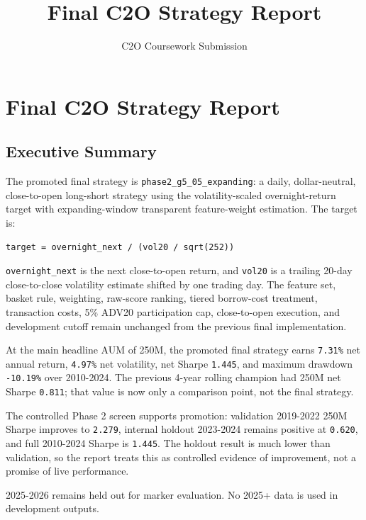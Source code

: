 \documentclass[
  10pt,
]{article}
\title{Final C2O Strategy Report}
\author{C2O Coursework Submission}
\date{}
\begin{document}
\maketitle

\hypertarget{final-c2o-strategy-report}{%
\section{Final C2O Strategy Report}\label{final-c2o-strategy-report}}

\hypertarget{executive-summary}{%
\subsection{Executive Summary}\label{executive-summary}}

The promoted final strategy is \texttt{phase2\_g5\_05\_expanding}: a
daily, dollar-neutral, close-to-open long-short strategy using the
volatility-scaled overnight-return target with expanding-window
transparent feature-weight estimation. The target is:

\begin{verbatim}
target = overnight_next / (vol20 / sqrt(252))
\end{verbatim}

\texttt{overnight\_next} is the next close-to-open return, and
\texttt{vol20} is a trailing 20-day close-to-close volatility estimate
shifted by one trading day. The feature set, basket rule, weighting,
raw-score ranking, tiered borrow-cost treatment, transaction costs, 5\%
ADV20 participation cap, close-to-open execution, and development cutoff
remain unchanged from the previous final implementation.

At the main headline AUM of 250M, the promoted final strategy earns
\texttt{7.31\%} net annual return, \texttt{4.97\%} net volatility, net
Sharpe \texttt{1.445}, and maximum drawdown \texttt{-10.19\%} over
2010-2024. The previous 4-year rolling champion had 250M net Sharpe
\texttt{0.811}; that value is now only a comparison point, not the final
strategy.

The controlled Phase 2 screen supports promotion: validation 2019-2022
250M Sharpe improves to \texttt{2.279}, internal holdout 2023-2024
remains positive at \texttt{0.620}, and full 2010-2024 Sharpe is
\texttt{1.445}. The holdout result is much lower than validation, so the
report treats this as controlled evidence of improvement, not a promise
of live performance.

2025-2026 remains held out for marker evaluation. No 2025+ data is used
in development outputs.
\end{document}
